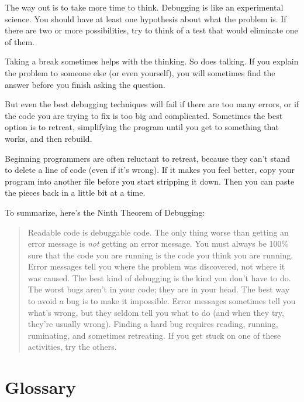 \documentclass{book}
\newcommand{\displaythrm}[1]{%
    \ifthenelse{\equal{#1}{1}}%
        {Readable code is debuggable code.}{%
    \ifthenelse{\equal{#1}{2}}%
        {The only thing worse than getting an error message is {\em
         not} getting an error message.}{%
    \ifthenelse{\equal{#1}{3}}%
        {You must always be 100\% sure that the code you are running
         is the code you think you are running.}{%
    \ifthenelse{\equal{#1}{4}}%
        {Error messages tell you where the problem was discovered,
         not where it was caused.}{%
    \ifthenelse{\equal{#1}{5}}%
        {The best kind of debugging is the kind you don't have to do.}{%
    \ifthenelse{\equal{#1}{6}}%
        {The worst bugs aren't in your code; they are in your head.}{%
    \ifthenelse{\equal{#1}{7}}%
        {The best way to avoid a bug is to make it impossible.}{%
    \ifthenelse{\equal{#1}{8}}%
        {Error messages sometimes tell you what's wrong, but they
         seldom tell you what to do (and when they try, they're usually
         wrong).}{%
    \ifthenelse{\equal{#1}{9}}%
        {Finding a hard bug requires reading, running, ruminating,
         and sometimes retreating.  If you get stuck on one of these
         activities, try the others.}{%
    {}%
}}}}}}}}}}%
\begin{document}
The way out is to take more time to think.  Debugging is like an
experimental science.  You should have at least one hypothesis about
what the problem is.  If there are two or more possibilities, try to
think of a test that would eliminate one of them.

Taking a break sometimes helps with the thinking.  So does talking.
If you explain the problem to someone else (or even yourself), you
will sometimes find the answer before you finish asking the question.

But even the best debugging techniques will fail if there are too many
errors, or if the code you are trying to fix is too big and
complicated.  Sometimes the best option is to retreat, simplifying the
program until you get to something that works, and then rebuild.

Beginning programmers are often reluctant to retreat, because
they can't stand to delete a line of code (even if it's wrong).
If it makes you feel better, copy your program into another file
before you start stripping it down.  Then you can paste the pieces
back in a little bit at a time.

To summarize, here's the Ninth Theorem of Debugging:

\begin{quote}
\displaythrm{9}
\end{quote}



\section{Glossary}
\end{document}
